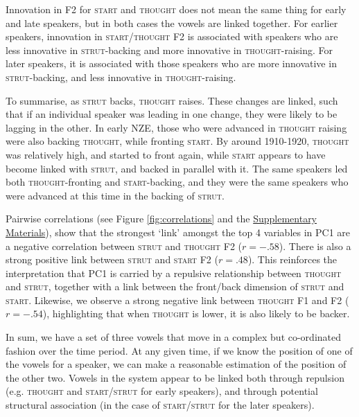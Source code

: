 \documentclass[review]{elsarticle} %
\begin{document}
Innovation in F2 for \textsc{start} and \textsc{thought} does not mean the same thing for early and late speakers, but in both cases the vowels are linked together.   For earlier speakers, innovation in \textsc{start/thought}  F2 is associated with speakers who are less innovative in \textsc{strut}-backing and more innovative in \textsc{thought}-raising.  For later speakers, it is associated with those speakers who are more innovative in \textsc{strut}-backing, and less innovative in \textsc{thought}-raising.

To summarise, as \textsc{strut} backs, \textsc{thought} raises.  These changes are linked, such that if an individual speaker was leading in one change, they were likely to be lagging in the other. In early NZE, those who were advanced in \textsc{thought} raising were also backing \textsc{thought}, while fronting \textsc{start}.  By around 1910-1920, \textsc{thought} was relatively high, and started to front again, while \textsc{start} appears to have become linked with  \textsc{strut}, and backed in parallel with it.  The same speakers led both \textsc{thought}-fronting and \textsc{start}-backing, and they were the same speakers who were advanced at this time in the backing of \textsc{strut}.   




Pairwise correlations (see Figure \ref{fig:correlations} and the \hyperref[sec:supplementarymaterials]{Supplementary Materials}), show that the strongest `link' amongst the top 4 variables in PC1 are a negative correlation between \textsc{strut} and \textsc{thought} F2 ($r = -.58$). There is also a strong positive link between \textsc{strut} and \textsc{start} F2 ($r = .48$). This reinforces the interpretation that PC1 is carried by a repulsive relationship between \textsc{thought} and \textsc{strut}, together with a link between the front/back dimension of \textsc{strut} and \textsc{start}. Likewise, we observe a strong negative link between \textsc{thought} F1 and F2 ($r = -.54$), highlighting that when \textsc{thought} is lower, it is also likely to be backer.


In sum, we have a set of three vowels that move in a complex but co-ordinated fashion over the time period.  At any given time, if we know the position of one of the vowels for a speaker, we can make a reasonable estimation of the position of the other two.  Vowels in the system appear to be linked both through repulsion (e.g. \textsc{thought} and \textsc{start/strut} for early speakers), and through potential structural association (in the case of \textsc{start/strut} for the later speakers).
\end{document}
